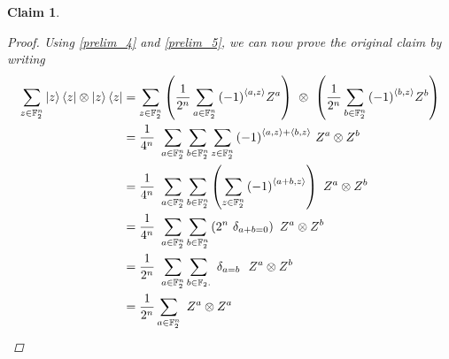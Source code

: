 \documentclass[11pt]{article}
\newtheorem{claim}[thm]{Claim}
\theoremstyle{definition}
\theoremstyle{plain}
\begin{document}
\begin{claim}
\begin{proof}
Using {\ref{prelim_4}} and {\ref{prelim_5}}, we can now prove the original claim by writing
\begin{align}
  \sum\limits_{z \in \mathbb{F}_2^n} \ket{z}\bra{z} \otimes \ket{z}\bra{z}
  &= \sum\limits_{z \in \mathbb{F}_2^n}
    \left( \frac{1}{2^n} \sum\limits_{a \in \mathbb{F}_2^n}
    {(-1)}^{\braket{a,z}} Z^a \right)  \ \otimes \
    \left( \frac{1}{2^n} \sum\limits_{b \in \mathbb{F}_2^n}
    {(-1)}^{\braket{b,z}} Z^b \right) \\
  &= \frac{1}{4^n} \ \sum\limits_{a \in \mathbb{F}_2^n}
    \sum\limits_{b \in \mathbb{F}_2^n} \sum\limits_{z \in \mathbb{F}_2^n}
    {(-1)}^{\braket{a,z} + \braket{b, z}} \ Z^a \otimes Z^b  \\
  &= \frac{1}{4^n} \ \sum\limits_{a \in \mathbb{F}_2^n}
    \sum\limits_{b \in \mathbb{F}_2^n} \left( \sum\limits_{z \in \mathbb{F}_2^n}
    {(-1)}^{\braket{a + b,z}} \right) \ Z^a \otimes Z^b  \\
  &= \frac{1}{4^n} \ \sum\limits_{a \in \mathbb{F}_2^n}
    \sum\limits_{b \in \mathbb{F}_2^n} \left( 2^n \ \delta_{a+b = 0} \right)
    \ Z^a \otimes Z^b  \\
  &= \frac{1}{2^n} \  \sum\limits_{a \in \mathbb{F}_2^n}
    \sum\limits_{b \in \mathbb{F}_2^^n} \ \delta_{a = b} \
    \ Z^a \otimes Z^b \\ 
  &= \frac{1}{2^n} \sum\limits_{a \in \mathbb{F}_2^n} \ Z^a \otimes Z^a
\end{align}
\end{proof}
\end{claim}
\end{document}
